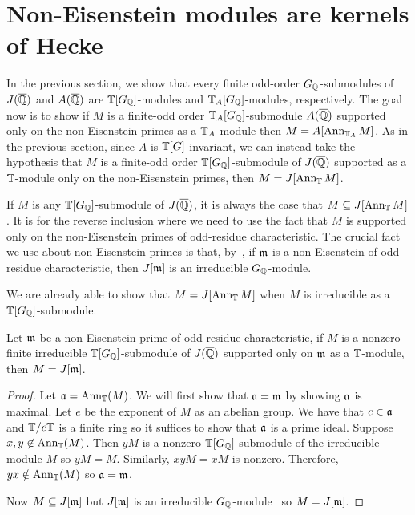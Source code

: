 \documentclass[thesis.tex]{subfiles}
\begin{document}
\section{Non-Eisenstein modules are kernels of Hecke}%
\label{sec:non_eisenstein_modules_are_kernels_of_hecke}

In the previous section, we show that every finite odd-order $G_{\mathbb{Q}}$-submodules of
$J(\overline{\mathbb{Q}})$ and $A(\overline{\mathbb{Q}})$ are $\mathbb{T}[G_{\mathbb{Q}}]$-modules and
$\mathbb{T}_A[G_{\mathbb{Q}}]$-modules, respectively. The goal now is to show if $M$ is a
finite-odd order $\mathbb{T}_A[G_{\mathbb{Q}}]$-submodule $A(\overline{\mathbb{Q}})$ supported only on the
non-Eisenstein primes as a $\mathbb{T}_A$-module then $M=A[\operatorname{Ann}_{\mathbb{T}_A} M]$. As in the
previous section, since $A$ is $\mathbb{T}[G]$-invariant, we can instead take the
hypothesis that $M$ is a finite-odd order $\mathbb{T}[G_{\mathbb{Q}}]$-submodule of $J(\overline{\mathbb{Q}})$
supported as a $\mathbb{T}$-module only on the non-Eisenstein primes, then
$M=J[\operatorname{Ann}_{\mathbb{T}} M]$.

If $M$ is any $\mathbb{T}[G_{\mathbb{Q}}]$-submodule of $J(\overline{\mathbb{Q}})$, it is always the case that
$M\subseteq J[\operatorname{Ann}_{\mathbb{T}} M]$. It is for the reverse inclusion where we need to
use the fact that $M$ is supported only on the non-Eisenstein primes of
odd-residue characteristic. The crucial fact we use about non-Eisenstein primes
is that, by~\cite[Prop. 14.2]{mazur:eisenstein}, if $\mathfrak{m}$ is a non-Eisenstein of
odd residue characteristic, then $J[\mathfrak{m}]$ is an irreducible $G_{\mathbb{Q}}$-module.

We are already able to show that $M=J[\operatorname{Ann}_{\mathbb{T}} M]$ when $M$ is irreducible as
a $\mathbb{T}[G_{\mathbb{Q}}]$-submodule.
\begin{proposition}
    Let $\mathfrak{m}$ be a non-Eisenstein prime of odd residue characteristic, if $M$ is
    a nonzero finite irreducible $\mathbb{T}[G_{\mathbb{Q}}]$-submodule of $J(\overline{\mathbb{Q}})$
    supported only on $\mathfrak{m}$ as a $\mathbb{T}$-module, then $M=J[\mathfrak{m}]$.
\end{proposition}
\begin{proof}
    Let $\mathfrak{a}=\operatorname{Ann}_{\mathbb{T}}(M)$. We will first show that $\mathfrak{a}=\mathfrak{m}$ by showing $\mathfrak{a}$ is
    maximal. Let $e$ be the exponent of $M$ as an abelian group. We have that
    $e\in \mathfrak{a}$ and $\mathbb{T}/e\mathbb{T}$ is a finite ring so it suffices to show that $\mathfrak{a}$
    is a prime ideal. Suppose $x,y\not\in \operatorname{Ann}_{\mathbb{T}}(M)$. Then $yM$ is a nonzero
    $\mathbb{T}[G_{\mathbb{Q}}]$-submodule of the irreducible module $M$ so $yM=M$. Similarly, $xyM = xM$ is
    nonzero. Therefore, $yx\notin \operatorname{Ann}_{\mathbb{T}}(M)$ so $\mathfrak{a}=\mathfrak{m}$.

    Now $M\subseteq J[\mathfrak{m}]$ but $J[\mathfrak{m}]$ is an irreducible
    $G_{\mathbb{Q}}$-module~\cite[Proposition 14.2]{mazur:eisenstein} so $M=J[\mathfrak{m}]$.
\end{proof}
\end{document}

